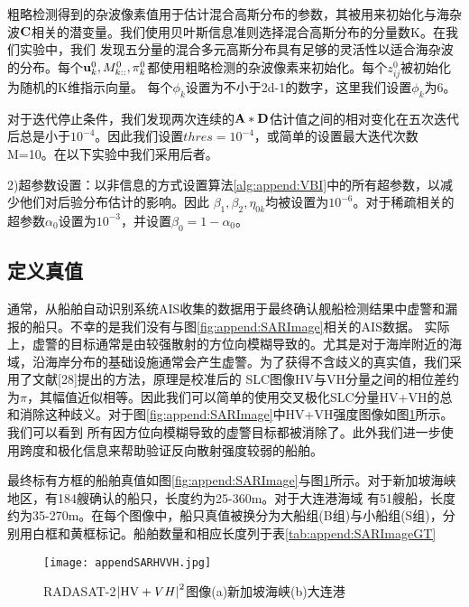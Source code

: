 粗略检测得到的杂波像素值用于估计混合高斯分布的参数，其被用来初始化与海杂波$\bf{C}$相关的潜变量。我们使用贝叶斯信息准则选择混合高斯分布的分量数K。在我们实验中，我们
发现五分量的混合多元高斯分布具有足够的灵活性以适合海杂波的分布。每个${\bf{u}}_k^0,M_{k::}^0,\pi _k^0$都使用粗略检测的杂波像素来初始化。每个$z_{ij}^0$被初始化为随机的K维指示向量。
每个${\phi _k}$设置为不小于2d-1的数字，这里我们设置${\phi _k}$为6。

对于迭代停止条件，我们发现两次连续的$\bf{A}*\bf{D}$估计值之间的相对变化在五次迭代后总是小于$10^{-4}$。因此我们设置$thres=10^{-4}$，或简单的设置最大迭代次数M=10。在以下实验中我们采用后者。

2)超参数设置：以非信息的方式设置算法\ref{alg:append:VBI}中的所有超参数，以减少他们对后验分布估计的影响。因此
$\beta_1,\beta_2,{\eta_{0k}}$均被设置为$10^{-6}$。对于稀疏相关的超参数$\alpha_0$设置为$10^{-3}$，并设置$\beta_0=1-\alpha_0$。
\subsection{定义真值}
通常，从船舶自动识别系统AIS收集的数据用于最终确认舰船检测结果中虚警和漏报的船只。不幸的是我们没有与图\ref{fig:append:SARImage}相关的AIS数据。
实际上，虚警的目标通常是由较强散射的方位向模糊导致的。尤其是对于海岸附近的海域，沿海岸分布的基础设施通常会产生虚警。为了获得不含歧义的真实值，我们采用了文献[28]提出的方法，原理是校准后的
SLC图像HV与VH分量之间的相位差约为$\pi$，其幅值近似相等。因此我们可以简单的使用交叉极化SLC分量HV+VH的总和消除这种歧义。对于图\ref{fig:append:SARImage}中HV+VH强度图像如图\ref{fig:append:SARHVVHImage}所示。我们可以看到
所有因方位向模糊导致的虚警目标都被消除了。此外我们进一步使用跨度和极化信息来帮助验证反向散射强度较弱的船舶。

最终标有方框的船舶真值如图\ref{fig:append:SARImage}与图\ref{fig:append:SARHVVHImage}所示。对于新加坡海峡地区，有184艘确认的船只，长度约为25-360m。对于大连港海域
有51艘船，长度约为35-270m。在每个图像中，船只真值被换分为大船组(B组)与小船组(S组)，分别用白框和黄框标记。船舶数量和相应长度列于表\ref{tab:append:SARImageGT}
  \begin{figure}[H] %
    \centering
    \texttt{[image: appendSARHVVH.jpg]}
    \caption{RADASAT-2${\left| {{\rm{HV}} + VH} \right|^2}$图像(a)新加坡海峡(b)大连港}
    \label{fig:append:SARHVVHImage}
  \end{figure}

